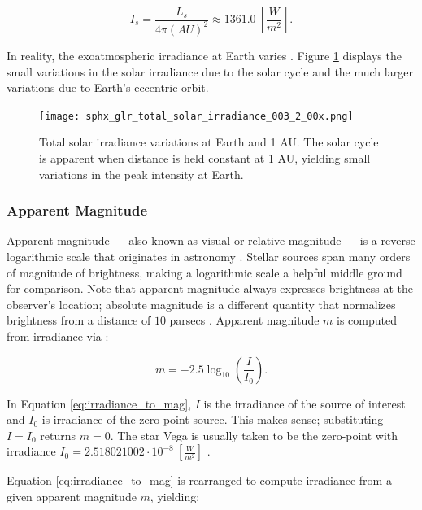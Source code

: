 \begin{equation} \label{eq:solar_constant_mean}
  I_s = \frac{L_s}{4\pi \left(AU\right)^2} \approx 1361.0 \: \left[ \frac{W}{m^2} \right].
\end{equation}

In reality, the exoatmospheric irradiance at Earth varies \cite{frueh2019notes}. Figure \ref{fig:tsi} displays the small variations in the solar irradiance due to the solar cycle and the much larger variations due to Earth's eccentric orbit.

\begin{figure}[ht]
  \centering
  \texttt{[image: sphx\_glr\_total\_solar\_irradiance\_003\_2\_00x.png]}
  \caption{Total solar irradiance variations at Earth and 1 AU. The solar cycle is apparent when distance is held constant at 1 AU, yielding small variations in the peak intensity at Earth.}
  \label{fig:tsi}
\end{figure}

\subsubsection{Apparent Magnitude}

Apparent magnitude ---  also known as visual or relative magnitude --- is a reverse logarithmic scale
that originates in astronomy \cite{frueh2019notes}. Stellar sources span many orders of magnitude of brightness, making a
logarithmic scale a helpful middle ground for comparison. Note that apparent magnitude always
expresses brightness at the observer's location; absolute magnitude is a different quantity that
normalizes brightness from a distance of $10$ parsecs \cite{frueh2019notes}. Apparent magnitude $m$
is computed from irradiance via \cite{frueh2019notes}:

\begin{equation} \label{eq:irradiance_to_mag}
  m = -2.5 \log_{10}\left( \frac{I}{I_0} \right).
\end{equation}

In Equation \ref{eq:irradiance_to_mag}, $I$ is the irradiance of the source of interest and $I_0$ is
irradiance of the zero-point source. This makes sense; substituting $I = I_0$ returns
$m=0$. The star Vega is usually taken to be the zero-point with irradiance $I_0 = 2.518021002\cdot
10^{-8} \: \left[ \frac{W}{m^2} \right]$ \cite{frueh2019notes}.

Equation \ref{eq:irradiance_to_mag} is rearranged to compute irradiance from a given apparent magnitude $m$, yielding:

